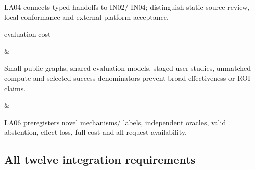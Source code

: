 \documentclass[
  10pt,
]{article}
\begin{document}
\begin{longtable}[]
\begin{minipage}[t]{\linewidth}
LA04 connects typed handoffs to IN02/ IN04; distinguish static source
review, local conformance and external platform acceptance.\strut
\end{minipage}\tabularnewline
\begin{minipage}[t]{\linewidth}\raggedright
evaluation cost\strut
\end{minipage} & \begin{minipage}[t]{\linewidth}\raggedright
Small public graphs, shared evaluation models, staged user studies,
unmatched compute and selected success denominators prevent broad
effectiveness or ROI claims.\strut
\end{minipage} & \begin{minipage}[t]{\linewidth}\raggedright
LA06 preregisters novel mechanisms/ labels, independent oracles, valid
abstention, effect loss, full cost and all-request availability.\strut
\end{minipage}\tabularnewline
\bottomrule
\end{longtable}

\hypertarget{all-twelve-integration-requirements}{%
\subsection{All twelve integration
requirements}\label{all-twelve-integration-requirements}}
\end{document}
